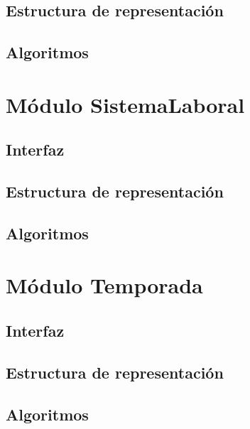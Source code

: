 \documentclass[10pt, a4paper]{article}
\begin{document}
\subsection{Estructura de representaci\'on}

\subsection{Algoritmos}

\newpage

\section{M\'odulo SistemaLaboral} 
\subsection{Interfaz}

\subsection{Estructura de representaci\'on}

\subsection{Algoritmos}

\newpage

\section{M\'odulo Temporada} 
\subsection{Interfaz}

\subsection{Estructura de representaci\'on}

\subsection{Algoritmos}

\newpage
\end{document}
